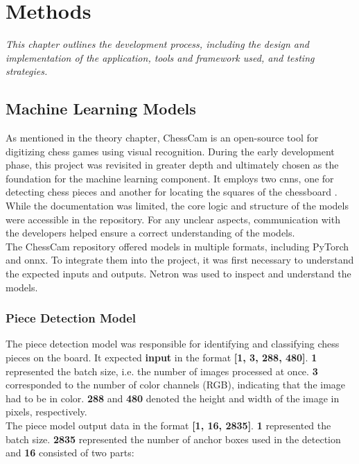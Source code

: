 \chapter{Methods}
\label{chp:methods}

\begin{center}
    \textit{This chapter outlines the development process, including the design and implementation of the application, tools and framework used, and testing strategies.}
\end{center}


\section{Machine Learning Models}
\label{sec:ml-models}

As mentioned in the theory chapter, ChessCam is an open-source tool for digitizing chess games using visual recognition. During the early development phase, this project was revisited in greater depth and ultimately chosen as the foundation for the machine learning component. It employs two \glspl{cnn}, one for detecting chess pieces and another for locating the squares of the chessboard \cite{github:chesscam}. While the documentation was limited, the core logic and structure of the models were accessible in the repository. For any unclear aspects, communication with the developers helped ensure a correct understanding of the models. \\

The ChessCam repository offered models in multiple formats, including PyTorch and \gls{onnx}. To integrate them into the project, it was first necessary to understand the expected inputs and outputs. Netron was used to inspect and understand the models.


\subsection{Piece Detection Model}
The piece detection model was responsible for identifying and classifying chess pieces on the board. It expected \textbf{input} in the format \textbf{[1, 3, 288, 480]}. \textbf{1} represented the batch size, i.e. the number of images processed at once. \textbf{3} corresponded to the number of color channels (RGB), indicating that the image had to be in color. \textbf{288} and \textbf{480} denoted the height and width of the image in pixels, respectively. \\

The piece model output data in the format \textbf{[1, 16, 2835]}. \textbf{1} represented the batch size. \textbf{2835} represented the number of anchor boxes used in the detection and \textbf{16} consisted of two parts: \\

